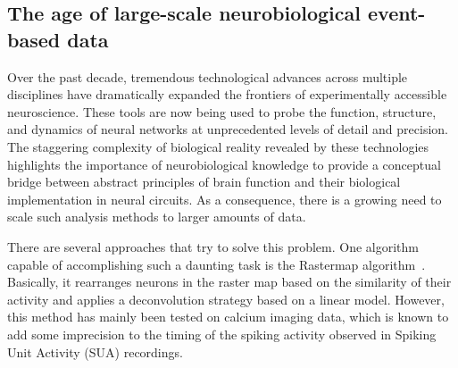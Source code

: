 \documentclass[runningheads]{llncs}
\begin{document}
\subsection{The age of large-scale neurobiological event-based data}
% 
Over the past decade, tremendous technological advances across multiple disciplines have dramatically expanded the frontiers of experimentally accessible neuroscience. %
These tools are now being used to probe the function, structure, and dynamics of neural networks at unprecedented levels of detail and precision. The staggering complexity of biological reality revealed by these technologies highlights the importance of neurobiological knowledge to provide a conceptual bridge between abstract principles of brain function and their biological implementation in neural circuits. As a consequence, there is a growing need to scale such analysis methods to larger amounts of data. 
 
There are several approaches that try to solve this problem. One algorithm capable of accomplishing such a daunting task is the Rastermap algorithm~\cite{pachitariu_robustness_2018}. Basically, it rearranges neurons in the raster map based on the similarity of their activity and applies a deconvolution strategy based on a linear model. However, this method has mainly been tested on calcium imaging data, which is known to add some imprecision to the timing of the spiking activity observed in Spiking Unit Activity (SUA) recordings. 
\end{document}
